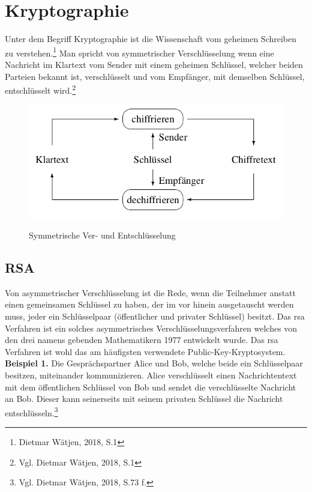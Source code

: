 \section{Kryptographie}
	\glqq Unter dem Begriff Kryptographie ist die Wissenschaft vom geheimen Schreiben zu verstehen\grqq.\footnote{Dietmar Wätjen, 2018, S.1} Man spricht von symmetrischer Verschlüsselung wenn eine Nachricht im Klartext vom Sender mit einem geheimen Schlüssel, welcher beiden Parteien bekannt ist, verschlüsselt und vom Empfänger, mit demselben Schlüssel, entschlüsselt wird.\footnote{Vgl. Dietmar Wätjen, 2018, S.1}\\
	\begin{figure}[h]
		\begin{minipage}{\textwidth}
			\centering
			\includegraphics[scale=0.5]{figures/ver-und-entschluesseln.png}
			\label{ver-und-entschluesselung}
			\caption{Symmetrische Ver- und Entschlüsselung}
		\end{minipage}
	\end{figure}	
	\subsection{RSA}
		Von asymmetrischer Verschlüsselung ist die Rede, wenn die Teilnehmer anstatt einen gemeinsamen Schlüssel zu haben, der im vor hinein ausgetauscht werden muss, jeder ein Schlüsselpaar (öffentlicher und privater Schlüssel) besitzt. Das \gls{rsa} Verfahren ist ein solches asymmetrisches Verschlüsselungsverfahren welches von den drei namens gebenden Mathematikern 1977 entwickelt wurde. Das \gls{rsa} Verfahren ist wohl das am häufigsten verwendete Public-Key-Kryptosystem.\\
		\textbf{Beispiel 1.} Die Gesprächspartner Alice und Bob, welche beide ein Schlüsselpaar besitzen, miteinander kommunizieren. Alice verschlüsselt einen Nachrichtentext mit dem öffentlichen Schlüssel von Bob und sendet die verschlüsselte Nachricht an Bob. Dieser kann seinerseits mit seinem privaten Schlüssel die Nachricht entschlüsseln.\footnote{Vgl. Dietmar Wätjen, 2018, S.73 f.}\\
